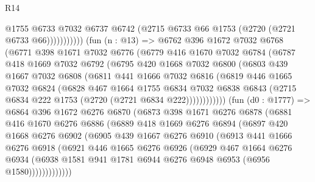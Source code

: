 \begin{lexlean}{R14}
\begin{coremodule}
                        @1755
                        @6733
                        @7032
                        @6737
                        @6742
                        (@2715 @6733 @66 @1753 (@2720 (@2721 @6733 @66)))))))))))
        (fun (n : @13) =>
        @6762
          @396
          @1672
          @7032
          @6768
          (@6771
            @398
            @1671
            @7032
            @6776
            (@6779
              @416
              @1670
              @7032
              @6784
              (@6787
                @418
                @1669
                @7032
                @6792
                (@6795
                  @420
                  @1668
                  @7032
                  @6800
                  (@6803
                    @439
                    @1667
                    @7032
                    @6808
                    (@6811
                      @441
                      @1666
                      @7032
                      @6816
                      (@6819
                        @446
                        @1665
                        @7032
                        @6824
                        (@6828
                          @467
                          @1664
                          @1755
                          @6834
                          @7032
                          @6838
                          @6843
                          (@2715 @6834 @222 @1753 (@2720 (@2721 @6834 @222))))))))))))
        (fun (d0 : @1777) =>
        @6864
          @396
          @1672
          @6276
          @6870
          (@6873
            @398
            @1671
            @6276
            @6878
            (@6881
              @416
              @1670
              @6276
              @6886
              (@6889
                @418
                @1669
                @6276
                @6894
                (@6897
                  @420
                  @1668
                  @6276
                  @6902
                  (@6905
                    @439
                    @1667
                    @6276
                    @6910
                    (@6913
                      @441
                      @1666
                      @6276
                      @6918
                      (@6921
                        @446
                        @1665
                        @6276
                        @6926
                        (@6929
                          @467
                          @1664
                          @6276
                          @6934
                          (@6938 @1581 @941 @1781 @6944 @6276 @6948 @6953 (@6956 @1580)))))))))))))

\end{coremodule}
\end{lexlean}
